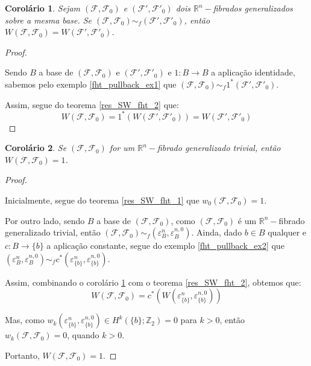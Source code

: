 \documentclass[12pt,oneside]{book} %
\newtheorem{cor}    {\hspace{0.5cm}Corol\'ario}[chapter]
\newcommand{\R}{\mathbb{R}}
\newcommand{\Z}{\mathbb{Z}}
\begin{document}
\begin{cor}\label{res_SW_fht 3}
	Sejam $(\mathcal{F},\mathcal{F}_{0})$ e $(\mathcal{F'},\mathcal{F'}_{0})$ dois $\R^{n}-$fibrados generalizados sobre a mesma base. Se $(\mathcal{F},\mathcal{F}_{0})\sim_{f} (\mathcal{F'},\mathcal{F'}_{0})$, então $W(\mathcal{F},\mathcal{F}_{0})=W(\mathcal{F'},\mathcal{F'}_{0})$.
\end{cor}
\begin{proof}
	
	\
	
	\par Sendo $B$ a base de $(\mathcal{F},\mathcal{F}_{0})$ e $(\mathcal{F'},\mathcal{F'}_{0})$ e $1:B\to B$ a aplicação identidade, sabemos pelo exemplo \ref{fht_pullback_ex1} que $(\mathcal{F},\mathcal{F}_{0})\sim_{f} 1^{*}(\mathcal{F'},\mathcal{F'}_{0})$.
	
	\par Assim, segue do teorema \ref{res_SW_fht_2} que:	
	$$ W(\mathcal{F},\mathcal{F}_{0})=1^{*}(W(\mathcal{F'},\mathcal{F'}_{0}))=W(\mathcal{F'},\mathcal{F'}_{0}) $$
	
\end{proof}

\begin{cor}\label{res_SW_fht_4}
	Se $(\mathcal{F},\mathcal{F}_{0})$ for um $\R^{n}-$fibrado generalizado trivial, então $W(\mathcal{F},\mathcal{F}_{0})=1$.
\end{cor}
\begin{proof}
	
	\
	
	\par Inicialmente, segue do teorema \ref{res_SW_fht_1} que $w_{0}(\mathcal{F},\mathcal{F}_{0})=1$.
	
	\par Por outro lado, sendo $B$ a base de $(\mathcal{F},\mathcal{F}_{0})$, como $(\mathcal{F},\mathcal{F}_{0})$ é um $\R^{n}-$fibrado generalizado trivial, então $(\mathcal{F},\mathcal{F}_{0})\sim_{f} (\varepsilon^{n}_{B},\varepsilon^{n,0}_{B})$. Ainda, dado $b\in B$ qualquer e $c:B\to \{ b \}$ a aplicação constante, segue do exemplo \ref{fht_pullback_ex2} que $(\varepsilon^{n}_{B},\varepsilon^{n,0}_{B})\sim_{f} c^{*}(\varepsilon^{n}_{\{ b \}},\varepsilon^{n,0}_{\{ b \}})$.
	
	\par Assim, combinando o corolário \ref{res_SW_fht 3} com o teorema \ref{res_SW_fht_2}, obtemos que:
	$$ W(\mathcal{F},\mathcal{F}_{0})=c^{*}(W(\varepsilon^{n}_{\{ b \}},\varepsilon^{n,0}_{\{ b \}})) $$
	
	\par Mas, como $w_{k}(\varepsilon^{n}_{\{ b \}},\varepsilon^{n,0}_{\{ b \}})\in H^{k}(\{ b \};\Z_{2})=0$ para $k>0$, então $w_{k}(\mathcal{F},\mathcal{F}_{0})=0$, quando $k>0$.
	
	\par Portanto, $W(\mathcal{F},\mathcal{F}_{0})=1$.
	
\end{proof}
\end{document}
